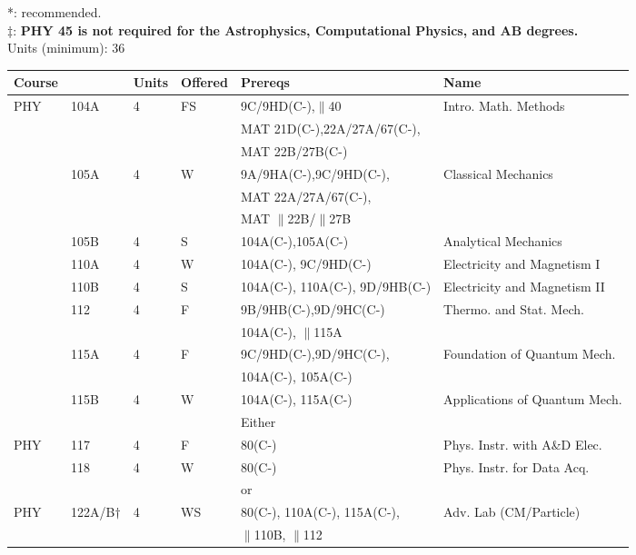 \documentclass[12pt]{article}
\begin{document}
*: recommended.\\
$\ddagger$: {\bf PHY 45 is not required for the Astrophysics,
Computational Physics, and AB degrees.}\\

\newpage
\vskip 2cm
\vskip 0.5cm
\noindent
Units (minimum):  36\\
\begin{tabular}{|llllll|}
\hline
Course & & Units & Offered & Prereqs & Name \\
\hline
PHY & 104A & 4 & FS & 9C/9HD(C-),$\parallel$40   & Intro. Math. Methods \\
    &      &   &    & MAT 21D(C-),22A/27A/67(C-), & \\
    &      &   &    & MAT 22B/27B(C-) & \\
    & 105A & 4 & W  & 9A/9HA(C-),9C/9HD(C-), & Classical Mechanics\\
    &      &   &    & MAT 22A/27A/67(C-), & \\
    &      &   &    & MAT $\parallel$22B/$\parallel$27B & \\
    & 105B & 4 & S  & 104A(C-),105A(C-)         & Analytical Mechanics\\ 
    & 110A & 4 & W  & 104A(C-), 9C/9HD(C-)      & Electricity and Magnetism I\\
    & 110B & 4 & S  & 104A(C-), 110A(C-), 9D/9HB(C-)      & Electricity and Magnetism II\\
    & 112  & 4 & F  & 9B/9HB(C-),9D/9HC(C-)      & Thermo. and Stat. Mech.\\
    &      &   &    & 104A(C-), $\parallel$115A  & \\ 
    & 115A & 4 & F  & 9C/9HD(C-),9D/9HC(C-),    & Foundation of Quantum Mech. \\
    &      &   &    & 104A(C-), 105A(C-)        & \\
    & 115B & 4 & W  & 104A(C-), 115A(C-)        & Applications of Quantum Mech. \\
\hline
\hline
    & & & & Either & \\
PHY & 117 & 4 &  F & 80(C-)                     & Phys. Instr. with A\&D Elec.  \\
    & 118 & 4 &  W & 80(C-)                     & Phys. Instr. for Data Acq. \\ 
\hline
    & & & & or & \\
PHY & 122A/B$\dagger$ & 4 & WS & 80(C-), 110A(C-), 115A(C-), & Adv. Lab (CM/Particle) \\  
    &        &   &    & $\parallel$110B, $\parallel$112 &  \\  
\hline
\end{tabular}\\ 
\end{document}
